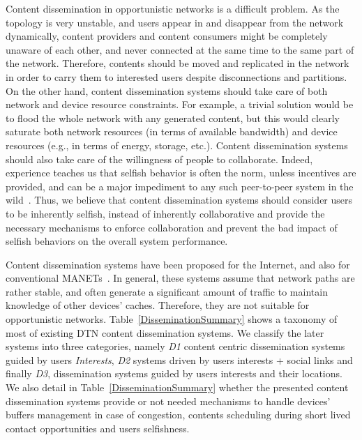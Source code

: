 Content dissemination in opportunistic networks is a difficult problem. As the topology is very unstable, and users appear in and disappear from the network dynamically, content providers and content consumers might be completely unaware of each other, and never connected at the same 
time to the same part of the network. Therefore, contents should be moved and replicated in the network in order to carry them to interested users despite disconnections 
and partitions. On the other hand, content dissemination systems should take care of both network and device resource constraints.
For example, a trivial solution would be to flood the whole network with any generated content, but this would clearly saturate both network resources (in terms of available bandwidth) and device resources (e.g., in terms of energy, storage, etc.). Content dissemination systems should also take care of the willingness of people to collaborate. Indeed,  
experience teaches us that selfish behavior is often the norm, unless incentives are provided, and can be a major impediment to any such peer-to-peer system in the wild~\cite{NashEquilibria}. Thus, we believe that content dissemination systems should consider users to be inherently selfish, instead of inherently collaborative and provide the necessary mechanisms to enforce collaboration and prevent the bad impact of selfish behaviors on the overall system performance.  

Content dissemination systems have been proposed for the Internet, and also for conventional MANETs~\cite{BitHoc}. In general, these systems assume that network paths are rather stable, and often generate a significant amount of traffic to maintain knowledge of other devices' caches. Therefore, they are not suitable for opportunistic networks. Table~\ref{DisseminationSummary} shows a taxonomy of most of existing DTN content dissemination systems. We classify the later systems into three categories, namely  
\emph{D1} content centric dissemination systems guided by users \emph{Interests}, \emph{D2} systems driven by users interests + social links and finally
\emph{D3}, dissemination systems guided by users interests and their locations. We also detail in Table~\ref{DisseminationSummary} whether the presented content dissemination systems provide or not needed mechanisms to handle devices' buffers management in case of congestion, contents scheduling during short lived contact opportunities and users selfishness. 


